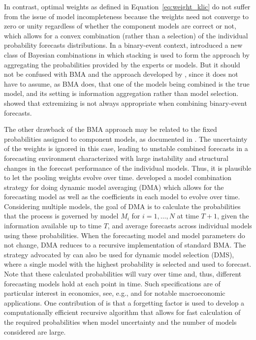 \documentclass[a4paper,11pt]{article}
\begin{document}
In contrast, optimal weights as defined in Equation~\eqref{eq:weight_klic} do not suffer from the issue of model incompleteness because the weights need not converge to zero or unity regardless of whether the component models are correct or not, which allows for a convex combination (rather than a selection) of the individual probability forecasts distributions. In a binary-event context, \citet{Lichtendahl2022-bi} introduced a new class of Bayesian combinations in which stacking is used to form the approach by aggregating the probabilities provided by the experts or models. But it should not be confused with BMA and the approach developed by \citet{Yao2018-st}, since it does not have to assume, as BMA does, that one of the models being combined is the true model, and its setting is information aggregation rather than model selection. \citet{Lichtendahl2022-bi} showed that extremizing \citep[i.e. shifting the average probability closer to its nearest extreme, see, e.g.,][]{Satopaa2016-mo} is not always appropriate when combining binary-event forecasts.

The other drawback of the BMA approach may be related to the fixed probabilities assigned to component models, as documented in \citet{Aastveit2018-lf}. The uncertainty of the weights is ignored in this case, leading to unstable combined forecasts in a forecasting environment characterized with large instability and structural changes in the forecast performance of the individual models. Thus, it is plausible to let the pooling weights evolve over time. \citet{Raftery2010-qe} developed a model combination strategy for doing dynamic model averaging (DMA) which allows for the forecasting model as well as the coefficients in each model to evolve over time. Considering multiple models, the goal of DMA is to calculate the probabilities that the process is governed by model $M_{i}$ for $i=1,\dots,N$ at time $T+1$, given the information available up to time $T$, and average forecasts across individual models using these probabilities. When the forecasting model and model parameters do not change, DMA reduces to a recursive implementation of standard BMA. The strategy advocated by \citet{Raftery2010-qe} can also be used for dynamic model selection (DMS), where a single model with the highest probability is selected and used to forecast. Note that these calculated probabilities will vary over time and, thus, different forecasting models hold at each point in time. Such specifications are of particular interest in economics, see, e.g., \citet{Koop2012-dma} and \citet{Del_Negro2016-ab} for notable macroeconomic applications. One contribution of \citet{Raftery2010-qe} is that a forgetting factor is used to develop a computationally efficient recursive algorithm that allows for fast calculation of the required probabilities when model uncertainty and the number of models considered are large.
\end{document}

